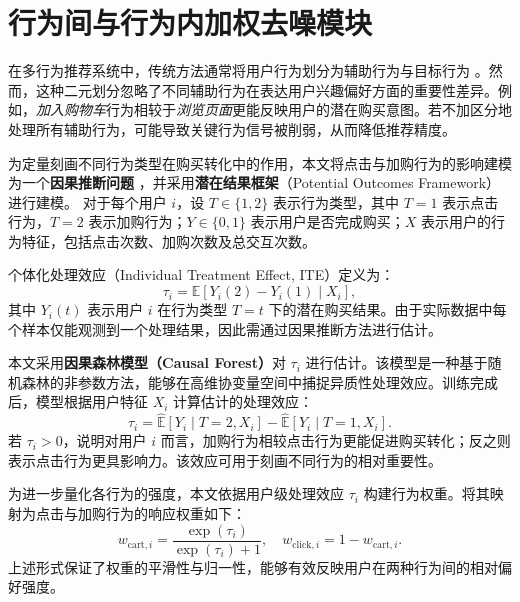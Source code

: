 \section{行为间与行为内加权去噪模块}

在多行为推荐系统中，传统方法通常将用户行为划分为辅助行为与目标行为 \cite{chen2021GHCF, gu2022S-MBRec, zhang2023DPT, xu2023MBSSL, jin2020MBGCN, xia2021MB-GMN}。然而，这种二元划分忽略了不同辅助行为在表达用户兴趣偏好方面的重要性差异。例如，\textit{加入购物车}行为相较于\textit{浏览页面}更能反映用户的潜在购买意图。若不加区分地处理所有辅助行为，可能导致关键行为信号被削弱，从而降低推荐精度。

为定量刻画不同行为类型在购买转化中的作用，本文将点击与加购行为的影响建模为一个\textbf{因果推断问题} \cite{yao2021survey}，并采用\textbf{潜在结果框架}（Potential Outcomes Framework）\cite{huang2012assessing, 1025304585.nh}进行建模。  
对于每个用户 $i$，设 $T \in \{1, 2\}$ 表示行为类型，其中 $T=1$ 表示点击行为，$T=2$ 表示加购行为；$Y \in \{0, 1\}$ 表示用户是否完成购买；$X$ 表示用户的行为特征，包括点击次数、加购次数及总交互次数。

个体化处理效应（Individual Treatment Effect, ITE）定义为：
\begin{equation}
    \tau_i = \mathbb{E}[Y_i(2) - Y_i(1) \mid X_i],
\end{equation}
其中 $Y_i(t)$ 表示用户 $i$ 在行为类型 $T=t$ 下的潜在购买结果。由于实际数据中每个样本仅能观测到一个处理结果，因此需通过因果推断方法进行估计。

本文采用\textbf{因果森林模型（Causal Forest）}对 $\tau_i$ 进行估计。该模型是一种基于随机森林的非参数方法，能够在高维协变量空间中捕捉异质性处理效应。训练完成后，模型根据用户特征 $X_i$ 计算估计的处理效应：
\begin{equation}
    \tau_i = \hat{\mathbb{E}}[Y_i \mid T=2, X_i] - \hat{\mathbb{E}}[Y_i \mid T=1, X_i].
\end{equation}
若 $\tau_i > 0$，说明对用户 $i$ 而言，加购行为相较点击行为更能促进购买转化；反之则表示点击行为更具影响力。该效应可用于刻画不同行为的相对重要性。

为进一步量化各行为的强度，本文依据用户级处理效应 $\tau_i$ 构建行为权重。将其映射为点击与加购行为的响应权重如下：
\begin{equation}
    w_{\text{cart}, i} = \frac{\exp(\tau_i)}{\exp(\tau_i) + 1}, \quad
    w_{\text{click}, i} = 1 - w_{\text{cart}, i}.
\end{equation}
上述形式保证了权重的平滑性与归一性，能够有效反映用户在两种行为间的相对偏好强度。

